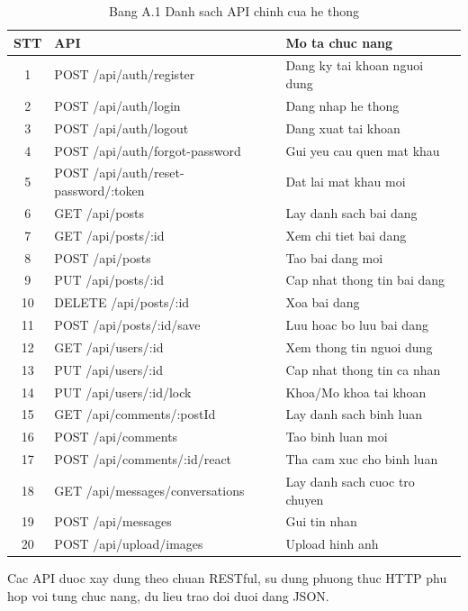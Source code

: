 \begin{table}[H]
\centering
\begin{tabular}{|c|p{5cm}|p{5cm}|}
\hline
STT & API & Mo ta chuc nang \\
\hline
1 & POST /api/auth/register & Dang ky tai khoan nguoi dung \\
\hline
2 & POST /api/auth/login & Dang nhap he thong \\
\hline
3 & POST /api/auth/logout & Dang xuat tai khoan \\
\hline
4 & POST /api/auth/forgot-password & Gui yeu cau quen mat khau \\
\hline
5 & POST /api/auth/reset-password/:token & Dat lai mat khau moi \\
\hline
6 & GET /api/posts & Lay danh sach bai dang \\
\hline
7 & GET /api/posts/:id & Xem chi tiet bai dang \\
\hline
8 & POST /api/posts & Tao bai dang moi \\
\hline
9 & PUT /api/posts/:id & Cap nhat thong tin bai dang \\
\hline
10 & DELETE /api/posts/:id & Xoa bai dang \\
\hline
11 & POST /api/posts/:id/save & Luu hoac bo luu bai dang \\
\hline
12 & GET /api/users/:id & Xem thong tin nguoi dung \\
\hline
13 & PUT /api/users/:id & Cap nhat thong tin ca nhan \\
\hline
14 & PUT /api/users/:id/lock & Khoa/Mo khoa tai khoan \\
\hline
15 & GET /api/comments/:postId & Lay danh sach binh luan \\
\hline
16 & POST /api/comments & Tao binh luan moi \\
\hline
17 & POST /api/comments/:id/react & Tha cam xuc cho binh luan \\
\hline
18 & GET /api/messages/conversations & Lay danh sach cuoc tro chuyen \\
\hline
19 & POST /api/messages & Gui tin nhan \\
\hline
20 & POST /api/upload/images & Upload hinh anh \\
\hline
\end{tabular}
\caption*{Bang A.1 Danh sach API chinh cua he thong}
\end{table}

Cac API duoc xay dung theo chuan RESTful, su dung phuong thuc HTTP phu hop voi tung chuc nang, du lieu trao doi duoi dang JSON.


